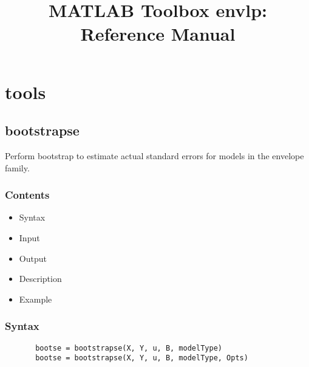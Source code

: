 \documentclass[a4paper,11pt,openany]{memoir}
\begin{document}
\title{MATLAB Toolbox \textbf{envlp}: Reference Manual}

\maketitle



\setcounter{tocdepth}{2}
\tableofcontents


\newpage


\chapter{tools}

\rmfamily
\color{black}\section{bootstrapse}

\begin{par}
Perform bootstrap to estimate actual standard errors for models in the envelope family.
\end{par} \vspace{1em}

\subsection*{Contents}

\begin{itemize}
\setlength{\itemsep}{-1ex}
   \item Syntax
   \item Input
   \item Output
   \item Description
   \item Example
\end{itemize}


\subsection*{Syntax}


\begin{verbatim}       bootse = bootstrapse(X, Y, u, B, modelType)
       bootse = bootstrapse(X, Y, u, B, modelType, Opts)\end{verbatim}
    
\end{document}
